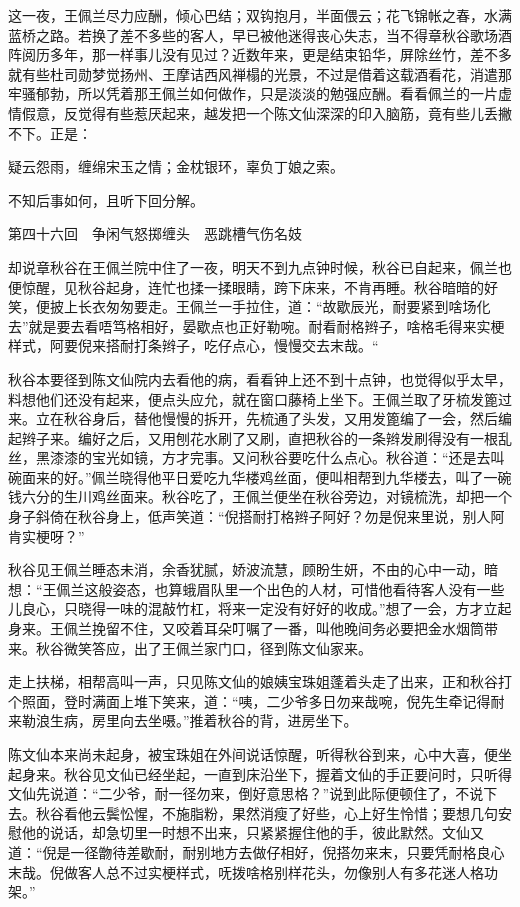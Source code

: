 \documentclass[12pt,UTF8]{ctexbook}
\begin{document}
{{{这一夜，王佩兰尽力应酬，倾心巴结；双钩抱月，半面偎云；花飞锦帐之春，水满蓝桥之路。若换了差不多些的客人，早已被他迷得丧心失志，当不得章秋谷歌场酒阵阅历多年，那一样事儿没有见过？近数年来，更是结束铅华，屏除丝竹，差不多就有些杜司勋梦觉扬州、王摩诘西风禅榻的光景，不过是借着这载酒看花，消遣那牢骚郁勃，所以凭着那王佩兰如何做作，只是淡淡的勉强应酬。看看佩兰的一片虚情假意，反觉得有些惹厌起来，越发把一个陈文仙深深的印入脑筋，竟有些儿丢撇不下。正是：

疑云怨雨，缠绵宋玉之情；金枕银环，辜负丁娘之索。

不知后事如何，且听下回分解。





第四十六回　争闲气怒掷缠头　恶跳槽气伤名妓





却说章秋谷在王佩兰院中住了一夜，明天不到九点钟时候，秋谷已自起来，佩兰也便惊醒，见秋谷起身，连忙也揉一揉眼睛，跨下床来，不肯再睡。秋谷暗暗的好笑，便披上长衣匆匆要走。王佩兰一手拉住，道：“故歇辰光，耐要紧到啥场化去”就是要去看唔笃格相好，晏歇点也正好勒啘。耐看耐格辫子，啥格毛得来实梗样式，阿要倪来搭耐打条辫子，吃仔点心，慢慢交去末哉。“

秋谷本要径到陈文仙院内去看他的病，看看钟上还不到十点钟，也觉得似乎太早，料想他们还没有起来，便点头应允，就在窗口藤椅上坐下。王佩兰取了牙梳发篦过来。立在秋谷身后，替他慢慢的拆开，先梳通了头发，又用发篦编了一会，然后编起辫子来。编好之后，又用刨花水刷了又刷，直把秋谷的一条辫发刷得没有一根乱丝，黑漆漆的宝光如镜，方才完事。又问秋谷要吃什么点心。秋谷道：“还是去叫碗面来的好。”佩兰晓得他平日爱吃九华楼鸡丝面，便叫相帮到九华楼去，叫了一碗钱六分的生川鸡丝面来。秋谷吃了，王佩兰便坐在秋谷旁边，对镜梳洗，却把一个身子斜倚在秋谷身上，低声笑道：“倪搭耐打格辫子阿好？勿是倪来里说，别人阿肯实梗呀？”

秋谷见王佩兰睡态未消，余香犹腻，娇波流慧，顾盼生妍，不由的心中一动，暗想：“王佩兰这般姿态，也算蛾眉队里一个出色的人材，可惜他看待客人没有一些儿良心，只晓得一味的混敲竹杠，将来一定没有好好的收成。”想了一会，方才立起身来。王佩兰挽留不住，又咬着耳朵叮嘱了一番，叫他晚间务必要把金水烟筒带来。秋谷微笑答应，出了王佩兰家门口，径到陈文仙家来。

走上扶梯，相帮高叫一声，只见陈文仙的娘姨宝珠姐蓬着头走了出来，正和秋谷打个照面，登时满面上堆下笑来，道：“咦，二少爷多日勿来哉啘，倪先生牵记得耐来勒浪生病，房里向去坐嗫。”推着秋谷的背，进房坐下。

陈文仙本来尚未起身，被宝珠姐在外间说话惊醒，听得秋谷到来，心中大喜，便坐起身来。秋谷见文仙已经坐起，一直到床沿坐下，握着文仙的手正要问时，只听得文仙先说道：“二少爷，耐一径勿来，倒好意思格？”说到此际便顿住了，不说下去。秋谷看他云鬓忪惺，不施脂粉，果然消瘦了好些，心上好生怜惜；要想几句安慰他的说话，却急切里一时想不出来，只紧紧握住他的手，彼此默然。文仙又道：“倪是一径朆待差歇耐，耐别地方去做仔相好，倪搭勿来末，只要凭耐格良心末哉。倪做客人总不过实梗样式，呒拨啥格别样花头，勿像别人有多花迷人格功架。”

}}}
\end{document}

